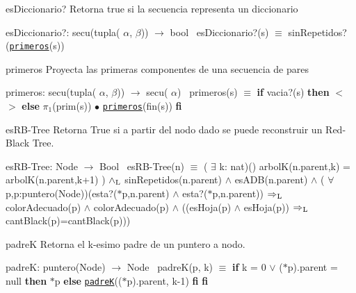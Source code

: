 \begin{DoxyParagraph}{es\+Diccionario?}
Retorna true si la secuencia representa un diccionario

es\+Diccionario?\+: secu(tupla( $\alpha$, $\beta$)) $\to$ bool~\newline
 es\+Diccionario?(s) $\equiv$ sin\+Repetidos?(\href{axiomas.html#primeros}{\tt primeros}(s)) 
\end{DoxyParagraph}


\begin{DoxyParagraph}{primeros}
Proyecta las primeras componentes de una secuencia de pares

primeros\+: secu(tupla( $\alpha$, $\beta$)) $\to$ secu( $\alpha$)~\newline
 primeros(s) $\equiv$ {\bfseries if} vacia?(s) {\bfseries then} $<$$>$ {\bfseries else} $\pi_1$(prim(s)) $\bullet$ \href{axiomas.html#primeros}{\tt primeros}(fin(s)) {\bfseries fi} 
\end{DoxyParagraph}


\begin{DoxyParagraph}{es\+R\+B-\/\+Tree}
Retorna True si a partir del nodo dado se puede reconstruir un Red-\/\+Black Tree.

es\+R\+B-\/\+Tree\+: Node $\to$ Bool~\newline
 es\+R\+B-\/\+Tree(n) $\equiv$ ( $\exists$ k\+: nat)() arbolK(n.\+parent,k) = arbolK(n.\+parent,k+1) ) $\land_{\rm L}$ sin\+Repetidos(n.\+parent) $\land$ es\+A\+DB(n.\+parent) $\land$ ( $\forall$ p,p\textquotesingle{}\+:puntero(\+Node))(esta?($\ast$p,n.\+parent) $\land$ esta?($\ast$p\textquotesingle{},n.\+parent)) $\Rightarrow_{\rm L}$ color\+Adecuado(p) $\land$ color\+Adecuado(p\textquotesingle{}) $\land$ ((es\+Hoja(p) $\land$ es\+Hoja(p\textquotesingle{})) $\Rightarrow_{\rm L}$ cant\+Black(p)=cant\+Black(p\textquotesingle{})))


\end{DoxyParagraph}
\begin{DoxyParagraph}{padreK}
Retorna el k-\/esimo padre de un puntero a nodo.

padreK\+: puntero(\+Node) $\to$ Node~\newline
 padre\+K(p, k) $\equiv$ {\bfseries if} k = 0 $\lor$ ($\ast$p).parent = null {\bfseries then} $\ast$p {\bfseries else} \href{axiomas.html#padreK}{\tt padreK}(($\ast$p).parent, k-\/1) {\bfseries fi} {\bfseries fi} 
\end{DoxyParagraph}
